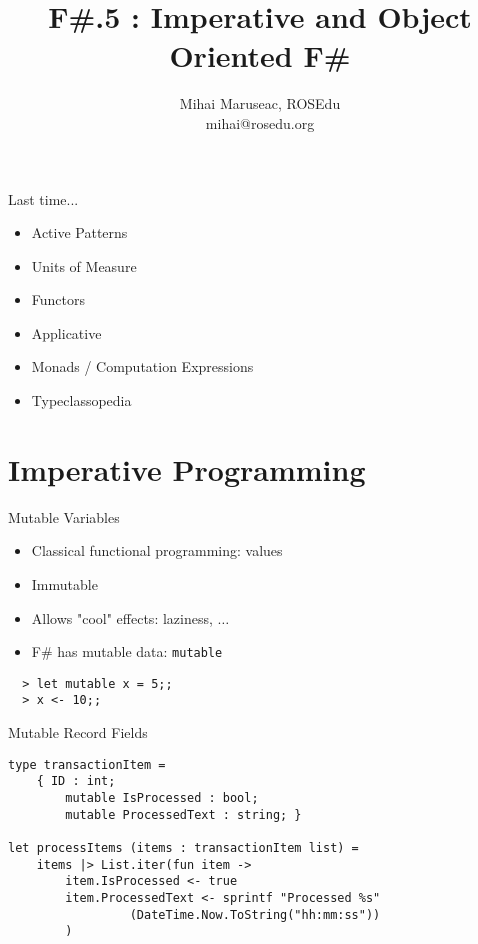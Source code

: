 \documentclass{beamer}
\title{F\#.5 : Imperative and Object Oriented F\#}
\author{Mihai Maruseac, ROSEdu\\mihai@rosedu.org}
\begin{document}
\maketitle

\begin{frame}
  \tableofcontents
\end{frame}

\begin{frame}{Last time...}
  \begin{itemize}[<+->]
    \item Active Patterns
    \item Units of Measure
    \item Functors
    \item Applicative
    \item Monads / Computation Expressions
    \item Typeclassopedia
  \end{itemize}
\end{frame}

\section{Imperative Programming}
\frame{\tableofcontents[currentsection]}

\begin{frame}[fragile]{Mutable Variables}
  \begin{itemize}[<+->]
    \item Classical functional programming: values
    \item Immutable
    \item Allows "cool" effects: laziness, $\ldots$
    \item F\# has mutable data: \texttt{mutable}
  \end{itemize}
  \pause
  \begin{verbatim}
  > let mutable x = 5;;
  > x <- 10;;
  \end{verbatim}
\end{frame}

\begin{frame}[fragile]{Mutable Record Fields}
  \begin{verbatim}
type transactionItem =
    { ID : int;
        mutable IsProcessed : bool;
        mutable ProcessedText : string; }

let processItems (items : transactionItem list) =
    items |> List.iter(fun item ->
        item.IsProcessed <- true
        item.ProcessedText <- sprintf "Processed %s"
                 (DateTime.Now.ToString("hh:mm:ss"))
        )
  \end{verbatim}
\end{frame}
\end{document}
